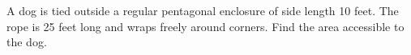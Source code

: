 A dog is tied outside a regular pentagonal enclosure of side length 10 feet. The rope is 25 feet long and wraps freely around corners. Find the area accessible to the dog.
